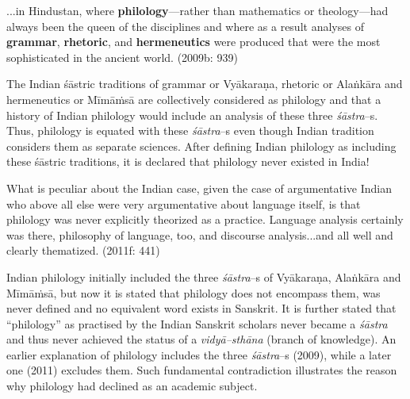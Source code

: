 \begin{myquote}
...in Hindustan, where \textbf{philology}—rather than mathematics or theology—had always been the queen of the disciplines and where as a result analyses of \textbf{grammar}, \textbf{rhetoric}, and \textbf{hermeneutics} were produced that were the most sophisticated in the ancient world. (2009b: 939)
\end{myquote}

The Indian śāstric traditions of grammar or Vyākaraṇa, rhetoric or Alaṅkāra and hermeneutics or Mīmāṁsā are collectively considered as philology and that a history of Indian philology would include an analysis of these three\textit{ śāstra}–s. Thus, philology is equated with these \textit{śāstra}–s even though Indian tradition considers them as separate sciences. After defining Indian philology as including these śāstric traditions, it is declared that philology never existed in India!

\begin{myquote}
What is peculiar about the Indian case, given the case of argumentative Indian who above all else were very argumentative about language itself, is that philology was never explicitly theorized as a practice. Language analysis certainly was there, philosophy of language, too, and discourse analysis...and all well and clearly thematized. (2011f: 441)
\end{myquote}

Indian philology initially included the three \textit{śāstra}–s of Vyākaraṇa, Alaṅkāra and Mīmāṁsā, but now it is stated that philology does not encompass them, was never defined and no equivalent word exists in Sanskrit. It is further stated that “philology” as practised by the Indian Sanskrit scholars never became a \textit{śāstra} and thus never achieved the status of a \textit{vidyā–sthāna} (branch of knowledge). An earlier explanation of philology includes the three \textit{śāstra}–s (2009), while a later one (2011) excludes them. Such fundamental contradiction illustrates the reason why philology had declined as an academic subject.

